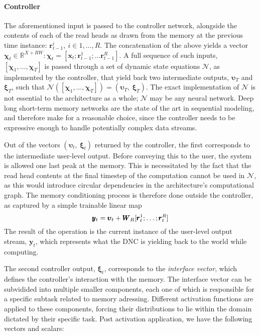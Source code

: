 \documentclass[]{article}
\begin{document}
\paragraph{Controller}
The aforementioned input is passed to the controller network, alongside the contents of each of the read heads as drawn from the memory at the previous time instance: $\pmb{r}_{t-1}^{i},\ i \in 1, \dots ,R$. The concatenation of the above yields a vector $\pmb{\chi}_t \in \mathbb{R}^{X + RW}: \pmb{\chi}_t = [\pmb{x}_t; \pmb{r}_{t-1}^1; \dots \pmb{r}_{t-1}^R ] $. A full sequence of such inputs, $[\pmb{\chi}_1,\dots ,\pmb{\chi}_T]$ is passed through a set of dynamic state equations $\mathcal{N}$, as implemented by the controller, that yield back two intermediate outputs, $\pmb{\upsilon }_T$ and $\pmb{\xi}_T$, such that $\mathcal{N}([\pmb{\chi}_1,\dots,\pmb{\chi}_T]) = (\pmb{\upsilon}_T,\ \pmb{\xi}_T)$. The exact implementation of $\mathcal{N}$ is not essential to the architecture as a whole; $\mathcal{N}$ may be any neural network. Deep long short-term memory networks are the state of the art in sequential modeling, and therefore make for a reasonable choice, since the controller needs to be expressive enough to handle potentially complex data streams.

Out of the vectors $(\pmb{\upsilon}_t,\ \pmb{\xi}_t)$ returned by the controller, the first corresponds to the intermediate user-level output. Before conveying this to the user, the system is allowed one last peak at the memory. This is necessitated by the fact that the read head contents at the final timestep of the computation cannot be used in $\mathcal{N}$, as this would introduce circular dependencies in the architecture's computational graph. The memory conditioning process is therefore done outside the controller, as captured by a simple trainable linear map \begin{equation}
\notag
\pmb{y}_t = \pmb{\upsilon}_t + \pmb{W}_R[\pmb{r}_{t}^1;\dots;\pmb{r}_{t}^R]
\label{eqn:Memory Conditioning}
\end{equation}
The result of the operation is the current instance of the user-level output stream, $\pmb{y}_t$, which represents what the DNC is yielding back to the world while computing. 

The second controller output, $\pmb{\xi}_t$, corresponds to the \textit{interface vector}, which defines the controller's interaction with the memory. The interface vector can be subvidided into multiple smaller components, each one of which is responsible for a specific subtask related to memory adressing. Different activation functions are applied to these components, forcing their distributions to lie within the domain dictated by their specific task. Post activation application, we have the following vectors and scalars:
\end{document}
